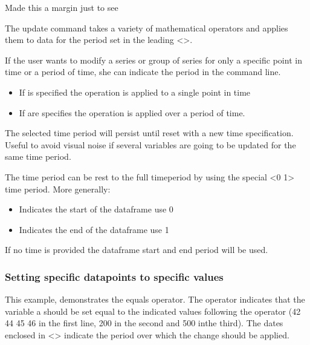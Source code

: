 \documentclass[letterpaper,10pt,english]{jupyterBook}
\begin{document}
\begin{sphinxShadowBox}
\sphinxstylesidebartitle{}

\sphinxAtStartPar
{}

\sphinxAtStartPar
Made this a margin just to see

\sphinxAtStartPar
The update command takes a variety of mathematical operators  and applies them to data for the period set in the leading <>.

\sphinxAtStartPar
If the user wants to modify a series or group of series for only a specific point in time or a period of time, she can indicate the period in the command line.
\begin{itemize}
\item {} 
\sphinxAtStartPar
If  is specified the operation is applied to a single point in time

\item {} 
\sphinxAtStartPar
If   are specifies the operation is applied over a period of time.

\end{itemize}

\sphinxAtStartPar
The selected time period will persist until re\sphinxhyphen{}set with a new time specification. Useful to avoid visual noise if several variables are going to be updated for the same time period.

\sphinxAtStartPar
The time period can be rest to the full time\sphinxhyphen{}period by using the special <\sphinxhyphen{}0 \sphinxhyphen{}1> time period.  More generally:
\begin{itemize}
\item {} 
\sphinxAtStartPar
Indicates the start of the dataframe use \sphinxhyphen{}0

\item {} 
\sphinxAtStartPar
Indicates the end of the dataframe use \sphinxhyphen{}1

\end{itemize}

\sphinxAtStartPar
If no time is provided the dataframe start and end period will be used.
\end{sphinxShadowBox}


\subsubsection{Setting specific datapoints to specific values}
\label{\detokenize{content/04_PythonEssentials/UpdateCommand:setting-specific-datapoints-to-specific-values}}
\sphinxAtStartPar
This example, demonstrates the equals operator.  The \sphinxcode{\sphinxupquote{=}} operator indicates that the variable a should be set equal to the indicated values following the \sphinxcode{\sphinxupquote{=}} operator (42 44 45 46 in the first line, 200 in the second and 500 inthe third). The dates enclosed in <> indicate the period over which the change should be applied.
\end{document}
